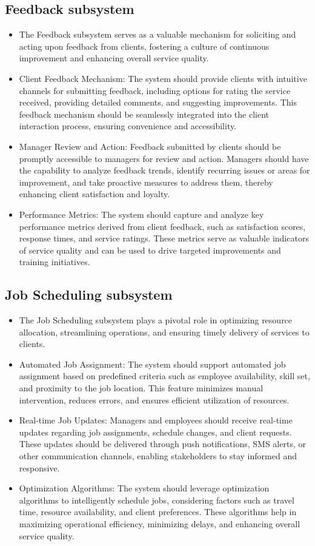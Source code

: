\documentclass{article}
\begin{document}
	\subsection*{Feedback subsystem}	
	\begin{itemize}
	    \item The Feedback subsystem serves as a valuable mechanism for soliciting and acting upon feedback from clients, fostering a culture of continuous improvement and enhancing overall service quality.
	    \item Client Feedback Mechanism: The system should provide clients with intuitive channels for submitting feedback, including options for rating the service received, providing detailed comments, and suggesting improvements. This feedback mechanism should be seamlessly integrated into the client interaction process, ensuring convenience and accessibility.
	    \item Manager Review and Action: Feedback submitted by clients should be promptly accessible to managers for review and action. Managers should have the capability to analyze feedback trends, identify recurring issues or areas for improvement, and take proactive measures to address them, thereby enhancing client satisfaction and loyalty.
	    \item Performance Metrics: The system should capture and analyze key performance metrics derived from client feedback, such as satisfaction scores, response times, and service ratings. These metrics serve as valuable indicators of service quality and can be used to drive targeted improvements and training initiatives.
	\end{itemize}
	\subsection*{Job Scheduling subsystem}
	\begin{itemize}
	    \item The Job Scheduling subsystem plays a pivotal role in optimizing resource allocation, streamlining operations, and ensuring timely delivery of services to clients.
	    \item Automated Job Assignment: The system should support automated job assignment based on predefined criteria such as employee availability, skill set, and proximity to the job location. This feature minimizes manual intervention, reduces errors, and ensures efficient utilization of resources.
	    \item Real-time Job Updates: Managers and employees should receive real-time updates regarding job assignments, schedule changes, and client requests. These updates should be delivered through push notifications, SMS alerts, or other communication channels, enabling stakeholders to stay informed and responsive.
	    \item Optimization Algorithms: The system should leverage optimization algorithms to intelligently schedule jobs, considering factors such as travel time, resource availability, and client preferences. These algorithms help in maximizing operational efficiency, minimizing delays, and enhancing overall service quality.
	\end{itemize}
\end{document}
